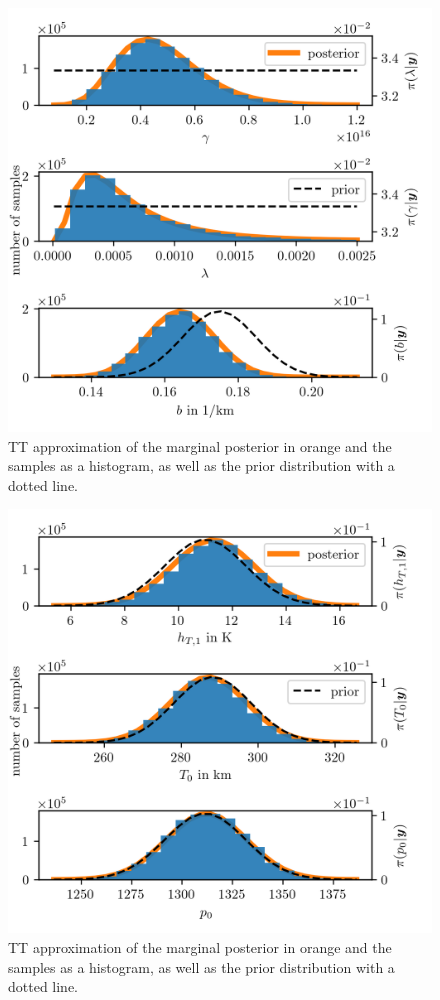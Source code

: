 \begin{figure}[ht!]
	\centering
	\includegraphics{PHdPTPost0.png}
	\caption[Histograms and TT approximation of posterior distribution as well as hyper-prior distribution.]{TT approximation of the marginal posterior in orange and the samples as a histogram, as well as the prior distribution with a dotted line.}
	\label{fig:PostHistTT0}
\end{figure}
\begin{figure}[ht!]
	\centering
	\includegraphics{PHdPTPost1.png}
	\caption[Histograms and TT approximation of posterior distribution as well as hyper-prior distribution.]{TT approximation of the marginal posterior in orange and the samples as a histogram, as well as the prior distribution with a dotted line.}
	\label{fig:PostHistTT1}
\end{figure}
